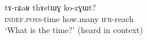  \begin{exe}
\ex
 \gll   tɤ-rʑaʁ 	thɤstɯɣ ko-zɣɯt? \\
  \textsc{indef.poss}-time how.many  \textsc{ifr}-reach \\
  \glt `What is the time?' (heard in context)
  \end{exe} 
%
%
%
%
% 
%
% 
% 
% 
%
%
%
%
%
